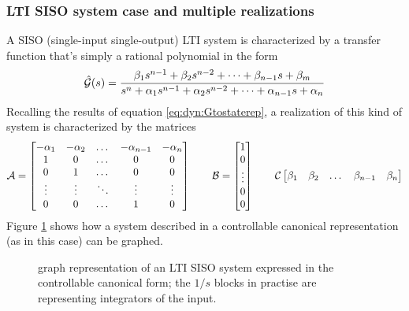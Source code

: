 		\subsubsection{LTI SISO system case and multiple realizations} \label{sec:canonicalforms}
		 A SISO (single-input single-output) LTI system is characterized by a transfer function that's simply a rational polynomial in the form
		\[ \hat {\mathcal{G}}(s) = \frac{\beta_1 s^{n-1} + \beta_2 s^{n-2} + \dots + \beta_{n-1} s + \beta_ m}{s^n + \alpha_1 s^{n-1} + \alpha_2 s^{n-2}+ \dots + \alpha_{n-1} s + \alpha_n } \]
		Recalling the results of equation \ref{eq:dyn:Gtostaterep}, a realization of this kind of system is characterized by the matrices
		\[ \mathcal{A} = \begin{bmatrix} -\alpha_1 & - \alpha_2 & \dots & - \alpha_{n-1} & - \alpha_n \\
		1 & 0 & \dots & 0 & 0 \\
		0 & 1 & \dots & 0 & 0 \\ 
		\vdots & \vdots & \ddots & \vdots & \vdots \\
		0 & 0 & \dots & 1 & 0  \end{bmatrix} \qquad \mathcal{B} = \begin{bmatrix} 1 \\ 0 \\ \vdots \\ 0 \\ 0 \end{bmatrix} \qquad \mathcal{C} \begin{bmatrix} \beta_1 & \beta_2 & \dots & \beta_{n-1} & \beta_n \end{bmatrix} \]
		Figure \ref{fig:dyn:controllablecanonical} shows how a system described in a controllable canonical representation (as in this case) can be graphed.
		
		\begin{figure}[bht]
			\centering {}
				\caption{graph representation of an LTI SISO system expressed in the controllable canonical form; the $1/s$ blocks in practise are representing integrators of the input.} \label{fig:dyn:controllablecanonical}
		\end{figure}
		
